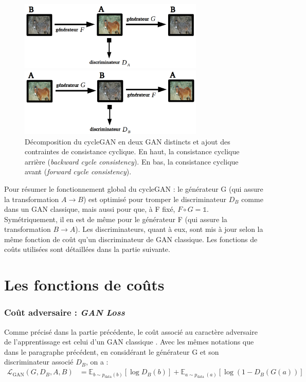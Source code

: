 \begin{figure}[!h]
\centering
\includegraphics[width=250pt]{"images/cycle/cycleBack"}

\vspace{6mm}

\includegraphics[width=250pt]{"images/cycle/cycleFor"}
\caption{Décomposition du cycleGAN en deux GAN distincts et ajout des contraintes de consistance cyclique. En haut, la consistance cyclique arrière (\textit{backward cycle consistency}). En bas, la consistance cyclique avant (\textit{forward cycle consistency}).}
\label{cycleForBack}
\end{figure}

Pour résumer le fonctionnement global du cycleGAN : le générateur G (qui assure la transformation $ A \rightarrow B $) est optimisé pour tromper le discriminateur $ D_B $ comme dans un GAN classique, mais aussi pour que, à F fixé, $ F \circ G = \mathbb{1} $. Symétriquement, il en est de même pour le générateur F (qui assure la transformation $ B \rightarrow A $). Les discriminateurs, quant à eux, sont mis à jour selon la même fonction de coût qu'un discriminateur de GAN classique. Les fonctions de coûts utilisées sont détaillées dans la partie suivante.


\section{Les fonctions de coûts}

\subsubsection{Coût adversaire : \textit{GAN Loss}}

Comme précisé dans la partie précédente, le coût associé au caractère adversaire de l'apprentissage est celui d'un GAN classique \cite{goodfellow_nips_2016}. Avec les mêmes notations que dans le paragraphe précédent, en considérant le générateur G et son discriminateur associé $D_B$, on a :
$$\begin{aligned}
\mathcal{L}_{\mathrm{GAN}}\left(G, D_{B}, A, B\right) &=\mathbb{E}_{b \sim p_{\mathrm{data}}(b)}\left[\log D_{B}(b)\right] +\mathbb{E}_{a \sim p_{\text {data }}(a)}\left[\log \left(1-D_{B}(G(a))\right]\right.
\end{aligned}$$

